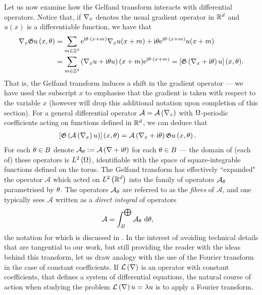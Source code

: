 Let us now examine how the Gelfand transform interacts with differential operators.
Notice that, if $\nabla_x$ denotes the usual gradient operator in $\mathbb{R}^d$ and $u(x)$ is a differentiable function, we have that
\begin{align*}
	\nabla_x\mathfrak{G} u\left( x,\theta \right) 
	&= \sum_{m\in\mathbb{Z}^d} \mathrm{e}^{\mathrm{i}\theta\cdot\left( x+m \right)}\nabla_x u(x+m) + \mathrm{i}\theta\mathrm{e}^{\mathrm{i}\theta\cdot\left( x+m \right)}u(x+m) \\
	&= \sum_{m\in\mathbb{Z}^d} \left( \nabla_x u + \mathrm{i}\theta u \right)(x+m)\mathrm{e}^{\mathrm{i}\theta\cdot\left( x+m \right)}
	= \left[ \mathfrak{G}\left( \nabla_x+\mathrm{i}\theta \right)u \right](x,\theta).
\end{align*}
That is, the Gelfand transform induces a shift in the gradient operator --- we have used the subscript $x$ to emphasise that the gradient is taken with respect to the variable $x$ (however will drop this additional notation upon completion of this section).
For a general differential operator $\mathcal{A} = \mathcal{A}\left( \nabla_x \right)$ with $\Omega$-periodic coefficients acting on functions defined in $\mathbb{R}^d$, we can deduce that
\begin{align*}
	\left[ \mathfrak{G}\left( \mathcal{A}\left( \nabla_x \right)u \right) \right](x,\theta) 
	&= \mathcal{A}\left( \nabla_x + \mathrm{i}\theta \right)\mathfrak{G} u\left( x,\theta \right).
\end{align*}
For each $\theta\in B$ denote $\mathcal{A}_{\theta}:=\mathcal{A}\left( \nabla+\mathrm{i}\theta \right)$ for each $\theta\in B$ --- the domain of (each of) these operators is $L^2\left( \Omega \right)$, identifiable with the space of square-integrable functions defined on the torus.
The Gelfand transform has effectively ``expanded" the operator $\mathcal{A}$ which acted on $L^2\left( \mathbb{R}^d \right)$ into the family of operators $\mathcal{A}_{\theta}$ parametrised by $\theta$.
The operators $\mathcal{A}_{\theta}$ are referred to as the \emph{fibres} of $\mathcal{A}$, and one typically  sees $\mathcal{A}$ written as a \emph{direct integral} of operators
\begin{align*}
	\mathcal{A} &= \int_{B}^{\bigoplus}\mathcal{A}_{\theta} \ \mathrm{d}\theta,
\end{align*}
the notation for which is discussed in \cite{reed1978iv}.
In the interest of avoiding technical details that are tangential to our work, but still providing the reader with the ideas behind this transform, let us draw analogy with the use of the Fourier transform in the case of constant coefficients.
If $\mathcal{L}\left( \nabla \right)$ is an operator with constant coefficients, that defines a system of differential equations, the natural course of action when studying the problem $\mathcal{L}\left( \nabla \right)u=\lambda u$ is to apply a Fourier transform.
